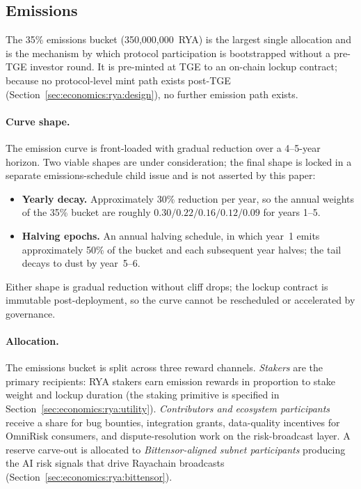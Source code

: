 \documentclass[11pt,a4paper]{article}
\begin{document}
\subsection{Emissions}\label{sec:economics:rya:emissions}

The 35\% emissions bucket (350{,}000{,}000~RYA) is the largest single allocation
and is the mechanism by which protocol participation is bootstrapped without a
pre-TGE investor round. It is pre-minted at TGE to an on-chain lockup contract;
because no protocol-level mint path exists post-TGE
(Section~\ref{sec:economics:rya:design}), no further emission path exists.

\paragraph{Curve shape.} The emission curve is front-loaded with gradual reduction
over a 4--5-year horizon. Two viable shapes are under consideration; the final shape
is locked in a separate emissions-schedule child issue and is not asserted by this
paper:
\begin{itemize}
  \item \textbf{Yearly decay.} Approximately 30\% reduction per year, so the
        annual weights of the 35\% bucket are roughly $0.30 / 0.22 / 0.16 / 0.12 /
        0.09$ for years 1--5.
  \item \textbf{Halving epochs.} An annual halving schedule, in which year~1 emits
        approximately 50\% of the bucket and each subsequent year halves; the tail
        decays to dust by year~5--6.
\end{itemize}
Either shape is gradual reduction without cliff drops; the lockup contract is
immutable post-deployment, so the curve cannot be rescheduled or accelerated by
governance.

\paragraph{Allocation.} The emissions bucket is split across three reward channels.
\emph{Stakers} are the primary recipients: RYA stakers earn emission rewards in
proportion to stake weight and lockup duration (the staking primitive is specified
in Section~\ref{sec:economics:rya:utility}). \emph{Contributors and ecosystem
participants} receive a share for bug bounties, integration grants, data-quality
incentives for OmniRisk consumers, and dispute-resolution work on the
risk-broadcast layer. A reserve carve-out is allocated to \emph{Bittensor-aligned
subnet participants} producing the AI risk signals that drive Rayachain broadcasts
(Section~\ref{sec:economics:rya:bittensor}).
\end{document}
